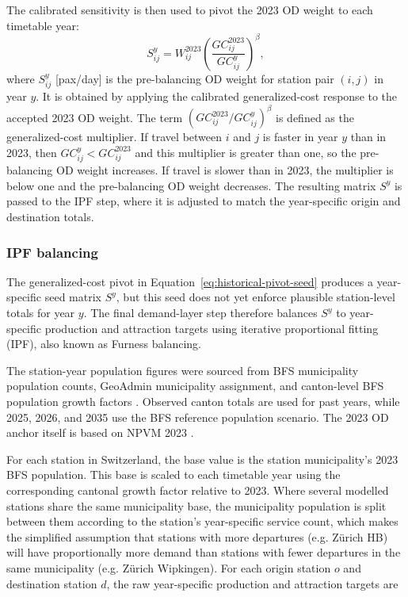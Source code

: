 \documentclass[preprint,12pt]{elsarticle}
\begin{document}
The calibrated sensitivity is then used to pivot the 2023 OD weight to each timetable year:
\begin{equation}
  S^y_{ij}=W^{2023}_{ij}\left(\frac{GC^{2023}_{ij}}{GC^y_{ij}}\right)^{\beta},
  \label{eq:historical-pivot-seed}
\end{equation}
where $S^y_{ij}$ [pax/day] is the pre-balancing OD weight for station pair $(i,j)$ in year $y$. It is obtained by applying the calibrated generalized-cost response to the accepted 2023 OD weight. The term $\left(GC^{2023}_{ij}/GC^y_{ij}\right)^{\beta}$ is defined as the generalized-cost multiplier. If travel between $i$ and $j$ is faster in year $y$ than in 2023, then $GC^y_{ij}<GC^{2023}_{ij}$ and this multiplier is greater than one, so the pre-balancing OD weight increases. If travel is slower than in 2023, the multiplier is below one and the pre-balancing OD weight decreases. The resulting matrix $S^y$ is passed to the IPF step, where it is adjusted to match the year-specific origin and destination totals.



\subsubsection{IPF balancing}\label{sec:methods-part1-ipf}

The generalized-cost pivot in Equation~\eqref{eq:historical-pivot-seed} produces a year-specific seed matrix $S^y$, but this seed does not yet enforce plausible station-level totals for year $y$. The final demand-layer step therefore balances $S^y$ to year-specific production and attraction targets using iterative proportional fitting (IPF), also known as Furness balancing.

The station-year population figures were sourced from BFS municipality population counts, GeoAdmin municipality assignment, and canton-level BFS population growth factors \citep{swisstopoGeoAdminIdentify, bfsCantonPopulation2024, bfsMunicipalityPopulation2024, bfsCantonPopulationScenarios2025}. Observed canton totals are used for past years, while 2025, 2026, and 2035 use the BFS reference population scenario. The 2023 OD anchor itself is based on NPVM 2023 \citep{vmuvek2026npvm2023}.

For each station in Switzerland, the base value is the station municipality's 2023 BFS population. This base is scaled to each timetable year using the corresponding cantonal growth factor relative to 2023.  Where several modelled stations share the same municipality base, the municipality population is split between them according to the station's year-specific service count, which makes the simplified assumption that stations with more departures (e.g. Zürich HB) will have proportionally more demand than stations with fewer departures in the same municipality (e.g. Zürich Wipkingen). For each origin station $o$ and destination station $d$, the raw year-specific production and attraction targets are
\end{document}
